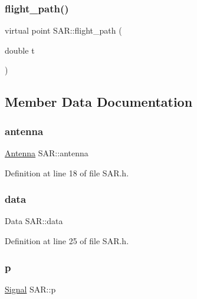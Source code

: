 \subsubsection{\texorpdfstring{flight\+\_\+path()}{flight\_path()}}
{\footnotesize\ttfamily virtual point S\+A\+R\+::flight\+\_\+path (\begin{DoxyParamCaption}\item[{double}]{t }\end{DoxyParamCaption})\hspace{0.3cm}{\ttfamily [virtual]}}



\subsection{Member Data Documentation}
\mbox{\label{class_s_a_r_a834de6d160196af5d7ea31c4140fb684}} 
\subsubsection{\texorpdfstring{antenna}{antenna}}
{\footnotesize\ttfamily \hyperlink{class_antenna}{Antenna} S\+A\+R\+::antenna}



Definition at line 18 of file S\+A\+R.\+h.

\mbox{\label{class_s_a_r_a36a5fb0ba45e7fafc60cce11664fd81d}} 
\subsubsection{\texorpdfstring{data}{data}}
{\footnotesize\ttfamily Data S\+A\+R\+::data}



Definition at line 25 of file S\+A\+R.\+h.

\mbox{\label{class_s_a_r_aa854bd6cbba87d014da962bea7a5e6d8}} 
\subsubsection{\texorpdfstring{p}{p}}
{\footnotesize\ttfamily \hyperlink{class_signal}{Signal} S\+A\+R\+::p}



